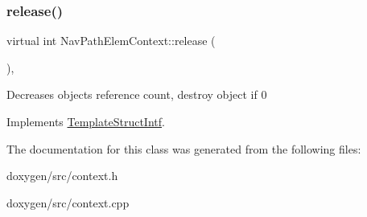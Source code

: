 \mbox{\label{class_nav_path_elem_context_af1e44c0b19b04c0b3ed51f955005a97e}} 
\subsubsection{\texorpdfstring{release()}{release()}}
{\footnotesize\ttfamily virtual int Nav\+Path\+Elem\+Context\+::release (\begin{DoxyParamCaption}{ }\end{DoxyParamCaption})\hspace{0.3cm}{\ttfamily [inline]}, {\ttfamily [virtual]}}

Decreases object\textquotesingle{}s reference count, destroy object if 0 

Implements \mbox{\hyperlink{class_template_struct_intf_a3dce7dd29d3f66a8080b40578e8a5045}{Template\+Struct\+Intf}}.



The documentation for this class was generated from the following files\+:\begin{DoxyCompactItemize}
\item 
doxygen/src/context.\+h\item 
doxygen/src/context.\+cpp\end{DoxyCompactItemize}
